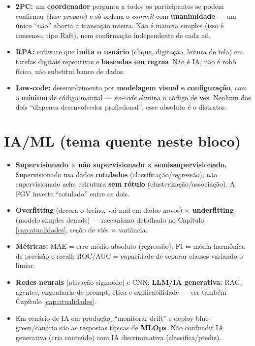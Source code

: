 \begin{itemize}
\item \textbf{2PC:} um \textbf{coordenador} pergunta a todos os participantes
se podem confirmar (fase \emph{prepare}) e só ordena o \emph{commit} com
\textbf{unanimidade} --- um único ``não'' aborta a transação inteira. Não é
maioria simples (isso é consenso, tipo Raft), nem confirmação independente de
cada nó.
\item \textbf{RPA:} software que \textbf{imita o usuário} (clique, digitação,
leitura de tela) em tarefas digitais repetitivas e \textbf{baseadas em
regras}. Não é IA, não é robô físico, não substitui banco de dados.
\item \textbf{Low-code:} desenvolvimento por \textbf{modelagem visual e
configuração}, com o \textbf{mínimo} de código manual --- \emph{no-code}
elimina o código de vez. Nenhum dos dois ``dispensa desenvolvedor
profissional'': esse absoluto é o distrator.
\end{itemize}

\section{IA/ML (tema quente neste bloco)}

\begin{itemize}
\item \textbf{Supervisionado} $\times$ \textbf{não supervisionado}
$\times$ \textbf{semissupervisionado.} Supervisionado usa dados
\textbf{rotulados} (classificação/regressão); não supervisionado acha
estrutura \textbf{sem rótulo} (clusterização/associação). A FGV inverte
``rotulado'' entre os dois.
\item \textbf{Overfitting} (decora o treino, vai mal em dados novos) $\times$
\textbf{underfitting} (modelo simples demais) --- mecanismo detalhado no
Capítulo \ref{cap:atualidades}, seção de viés $\times$ variância.
\item \textbf{Métricas:} MAE = erro médio absoluto (regressão); F1 = média
harmônica de precisão e recall; ROC/AUC = capacidade de separar classes
variando o limiar.
\item \textbf{Redes neurais} (ativação sigmoide) e CNN; \textbf{LLM/IA
generativa:} RAG, agentes, engenharia de prompt, ética e explicabilidade ---
ver também Capítulo \ref{cap:atualidades}.
\item Em cenário de IA em produção, ``monitorar drift'' e deploy
blue-green/canário são as respostas típicas de \textbf{MLOps}. Não confundir
IA generativa (cria conteúdo) com IA discriminativa (classifica/prediz).
\end{itemize}

